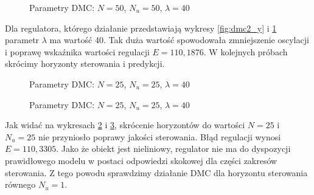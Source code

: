 \begin{figure}[H]
\centering
{}
\caption{Parametry DMC: $N=50$, $N_u=50$, $\lambda=40$}
\label{fig:dmc2_u}
\end{figure}

Dla regulatora, którego działanie przedstawiają wykresy \ref{fig:dmc2_y} i \ref{fig:dmc2_u} parametr $\lambda$ ma wartość 40. Tak duża wartość spowodowała zmniejszenie oscylacji i poprawę wskaźnika wartości regulacji $E=110,1876$. W kolejnych próbach skrócimy horyzonty sterowania i predykcji.

\begin{figure}[H]
\centering
{}
\caption{Parametry DMC: $N=25$, $N_u=25$, $\lambda=40$}
\label{fig:dmc3_y}
\end{figure}

\begin{figure}[H]
\centering
{}
\caption{Parametry DMC: $N=25$, $N_u=25$, $\lambda=40$}
\label{fig:dmc3_u}
\end{figure}

Jak widać na wykresach \ref{fig:dmc3_y} i \ref{fig:dmc3_u}, skrócenie horyzontów do wartości $N=25$ i $N_u=25$ nie przyniosło poprawy jakości sterowania. Błąd regulacji wynosi $E=110,3305$. Jako że obiekt jest nieliniowy, regulator nie ma do dyspozycji prawidłowego modelu w postaci odpowiedzi skokowej dla części zakresów sterowania. Z tego powodu sprawdzimy działanie DMC dla horyzontu sterowania równego $N_u=1$.

